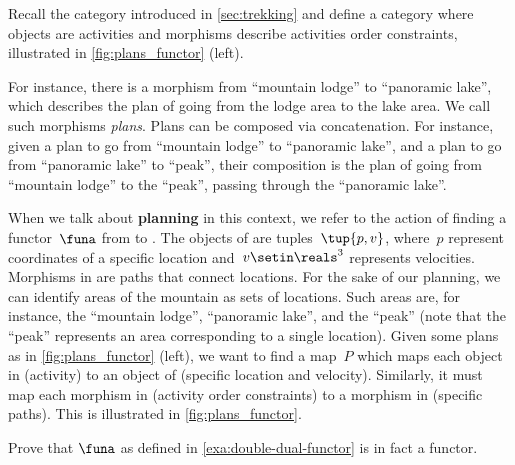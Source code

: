 \begin{example}
    \label{ex:planning-as-search-functor}
    Recall the category \Berg introduced in \cref{sec:trekking} and define a category \Plans where objects are activities and morphisms describe activities order constraints, illustrated in \cref{fig:plans_functor} (left).

    For instance, there is a morphism from ``mountain lodge'' to ``panoramic lake'', which describes the plan of going from the lodge area to the lake area.
    We call such morphisms \emph{plans}.
    Plans can be composed via concatenation.
    For instance, given a plan to go from ``mountain lodge'' to ``panoramic lake'', and a plan to go from ``panoramic lake'' to ``peak'', their composition is the plan of going from ``mountain lodge'' to the ``peak'', passing through the ``panoramic lake''.

    When we talk about \textbf{planning} in this context, we refer to the action of finding a functor~$\funa$ from \Plans to \Berg.
    The objects of \Berg are tuples~$\tup{p,v}$, where~$p$ represent coordinates of a specific location and~$v\setin \reals^3$ represents velocities.
    Morphisms in \Berg are paths that connect locations.
    For the sake of our planning, we can identify areas of the mountain as sets of locations.
    Such areas are, for instance, the ``mountain lodge'', ``panoramic lake'', and the
    ``peak'' (note that the ``peak'' represents an area corresponding to a single location).
    Given some plans as in \cref{fig:plans_functor} (left), we want to find a map~$P$ which maps each object in \Plans (activity) to an object of \Berg (specific location and velocity).
    Similarly, it must map each morphism in \Plans (activity order constraints) to a morphism in \Berg (specific paths).
    This is illustrated in \cref{fig:plans_functor}.
\end{example}

\begin{figure*}[h!]
    \centering
    \caption{Planning functor.}
    \label{fig:plans_functor}
\end{figure*}

\vfill
\clearpage
\vfill

\begin{gradedexercise}
    \label{ex:DoubleDualFunctor}
    Prove that $\funa$ as defined in \cref{exa:double-dual-functor} is in fact a functor.
\end{gradedexercise}

